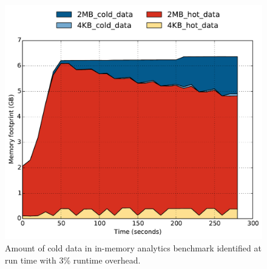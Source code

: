 %
\begin{figure}[t]
\centering
\includegraphics[width=1.0\columnwidth]{asplos2017/figures/ina-6g-new-policy-capacity_over_time.pdf}
\caption{Amount of cold data in in-memory analytics benchmark identified at run
time with 3\% runtime overhead.}
\label{fig:in-memory-analytics-capacity}
\end{figure}

